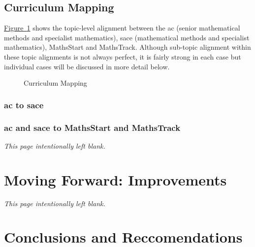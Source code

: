 \documentclass[twoside,12pt,a4paper]{report}
\makeatletter
\newcommand*{\intentionallyblankpage}{
  \vspace*{\fill}
  {\centering \textit{This page intentionally left blank.} \par}
  \vspace{\fill}}
\renewcommand*{\cleardoublepage}{\clearpage\if@twoside \ifodd\c@page\else
  \intentionallyblankpage
  \newpage
  \if@twocolumn\hbox{}\newpage\fi\fi\fi}
\newcommand{\reffig}[1]{\hyperref[fig:#1]{Figure~\ref{fig:#1}}}
\makeatother
\begin{document}
\section{Curriculum Mapping}
\label{sec:mapping}

\reffig{mapping} shows the topic-level alignment between the \gls{ac} (senior mathematical methods and specialist mathematics), \gls{sace} (mathematical methods and specialist mathematics), MathsStart and MathsTrack. Although sub-topic alignment within these topic alignments is not always perfect, it is fairly strong in each case but individual cases will be discussed in more detail below.

\begin{figure}[p]
\begin{center}

\caption{Curriculum Mapping
\label{fig:mapping}}
\end{center}
\end{figure}

\subsection{\gls{ac} to \gls{sace}}


\subsection{\gls{ac} and \gls{sace} to MathsStart and MathsTrack}







\cleardoublepage
\chapter{Moving Forward: Improvements} 
\label{chap:recommendations}

\lipsum[1-2]

\cleardoublepage
\chapter*{Conclusions and Reccomendations}
\end{document}
